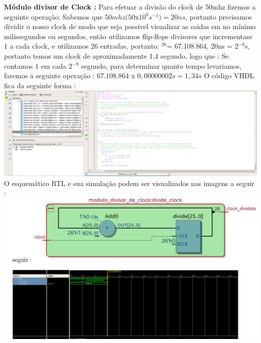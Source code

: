 \documentclass[11pt]{book}
\begin{document}
\textbf{Módulo divisor de Clock :} 
\newline\newline
Para efetuar a divisão do clock de 50mhz fizemos a seguinte operação: 
\newline\newline
Sabemos que $50mhz(50$x$10^{6}s^{-1}) = 20ns$, 
\newline\newline
portanto precisamos dividir o nosso clock de modo que seja possivel visualizar as saidas em no mínimo milissegundos ou segundos, então utilizamos flip-flops divisores que incrementase 1 a cada clock, e utilizamos 26 entradas, portanto:
\newline{}$^{26}$= 67.108.864, 20ns = 2$^{-8}$s, portanto temos um clock de aproximadamente 1,4 segundo, logo que : 
\newline\newline
 Se contamos $1$ em cada 2$^{-8}$ segundo, para determinar quanto tempo levariamos, faremos a seguinte operação : $67.108.864$ x $0,00000002s = 1,34s$
\newline\newline
O código VHDL fica da seguinte forma :
\newline\newline
\includegraphics[width=1.1\textwidth]{codigos_divideclock.png}%
\newline\newline
O esquemático RTL e sua simulação podem ser visualizados nas imagens a seguir :
\includegraphics[width=1.1\textwidth]{RTL_divisordeclock_simulacao_clockdividido.png}%
\newline\newline
\end{document}

